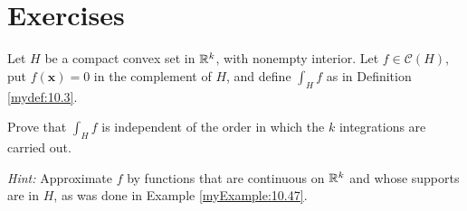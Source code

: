 
\section{Exercises}


\begin{myExercise}
    \label{ex:10.1}
    Let $H$ be a compact convex set in ${\protect\mathbb R}^k$, with nonempty interior. 
    Let $f \in \mathscr{C}(H)$, put $f(\mathbf{x}) = 0$ in the complement of $H$, 
    and define $\int_H f$ as in Definition \ref{mydef:10.3}.

    Prove that $\int_H f$ is independent of the order in which the $k$ integrations are carried out.

    \emph{Hint:} Approximate $f$ by functions that are continuous on ${\protect\mathbb R}^k$ and whose supports are in $H$, as was done in Example \ref{myExample:10.47}.
\end{myExercise}